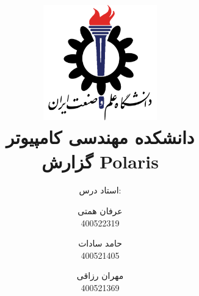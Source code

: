 \title{
    \center
    \includegraphics[width=5cm, height=5cm]{images/IUST_logo_color.png} \\
    دانشکده مهندسی کامپیوتر \\[25pt]     
گزارش Polaris\\
\CourseName
}

\author{
    استاد درس:
    \Instructor \\[25pt]
}

\author{
  عرفان همتی\\
  400522319
  \and
  حامد سادات\\
  400521405
  \and
  مهران رزاقی\\
  400521369
}
\date{\Semester}